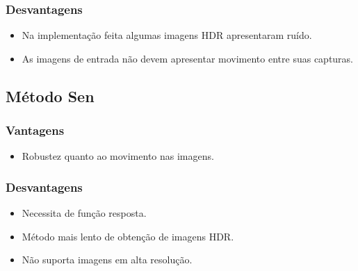 \subsubsection{Desvantagens}
\begin{itemize}
	\item Na implementação feita algumas imagens HDR apresentaram ruído.
	\item As imagens de entrada não devem apresentar movimento entre suas capturas.
\end{itemize}

\subsection{Método Sen} \label{discussaoSen}
\subsubsection{Vantagens}
\begin{itemize}
	\item Robustez quanto ao movimento nas imagens.
\end{itemize}
\subsubsection{Desvantagens}
\begin{itemize}
	\item Necessita de função resposta.
	\item Método mais lento de obtenção de imagens HDR.
	\item Não suporta imagens em alta resolução.
\end{itemize}